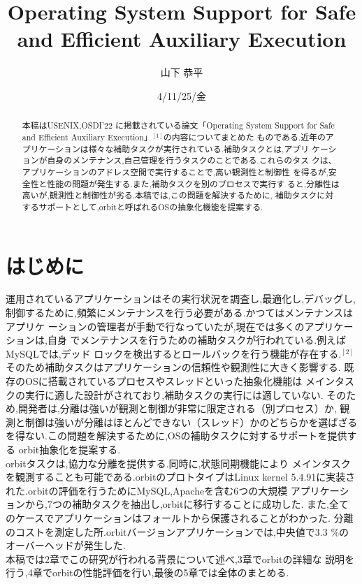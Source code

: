 \documentclass[submit,techreq,noauthor]{eco}	%
\begin{document}
\date   {4/11/25/金}				%
\title  {Operating System Support for Safe and Efficient Auxiliary Execution}	%
\author {山下 恭平}				%

\begin{abstract}
本稿はUSENIX,OSDI'22 に掲載されている論文「Operating System Support
 for Safe and Efficient Auxiliary Execution」\begin{math}^{[1]}\end{math}の内容についてまとめた
ものである.近年のアプリケーションは様々な補助タスクが実行されている.補助タスクとは,アプリ
ケーションが自身のメンテナンス,自己管理を行うタスクのことである.これらのタス
クは、アプリケーションのアドレス空間で実行することで,高い観測性と制御性
を得るが,安全性と性能の問題が発生する.また,補助タスクを別のプロセスで実行す
ると,分離性は高いが,観測性と制御性が劣る.本稿では,この問題を解決するために,
補助タスクに対するサポートとして,orbitと呼ばれるOSの抽象化機能を提案する.

\end{abstract}
\maketitle

\section{はじめに}
運用されているアプリケーションはその実行状況を調査し,最適化し,デバッグし,
制御するために,頻繁にメンテナンスを行う必要がある.かつてはメンテナンスはアプリケ
ーションの管理者が手動で行なっていたが,現在では多くのアプリケーションは,自身
でメンテナンスを行うための補助タスクが行われている.例えばMySQLでは,デッド
ロックを検出するとロールバックを行う機能が存在する.\begin{math}^{[2]}\end{math}
そのため補助タスクはアプリケーションの信頼性や観測性に大きく影響する.
\indent 既存のOSに搭載されているプロセスやスレッドといった抽象化機能は
メインタスクの実行に適した設計がされており,補助タスクの実行には適していない.
そのため,開発者は,分離は強いが観測と制御が非常に限定される（別プロセス）か,
観測と制御は強いが分離はほとんどできない（スレッド）かのどちらかを選ばざる
を得ない.この問題を解決するために,OSの補助タスクに対するサポートを提供する
orbit抽象化を提案する.\\
\indent orbitタスクは,協力な分離を提供する.同時に,状態同期機能により
メインタスクを観測することも可能である.orbitのプロトタイプはLinux kernel 
5.4.91に実装された.orbitの評価を行うためにMySQL,Apacheを含む6つの大規模
アプリケーションから,7つの補助タスクを抽出し,orbitに移行することに成功した.
また,全てのケースでアプリケーションはフォールトから保護されることがわかった.
分離のコストを測定した所.orbitバージョンアプリケーションでは,中央値で3.3
\%のオーバーヘッドが発生した.\\
\indent 本稿では2章でこの研究が行われる背景について述べ,3章でorbitの詳細な
説明を行う,4章でorbitの性能評価を行い,最後の5章では全体のまとめる.
\end{document}
